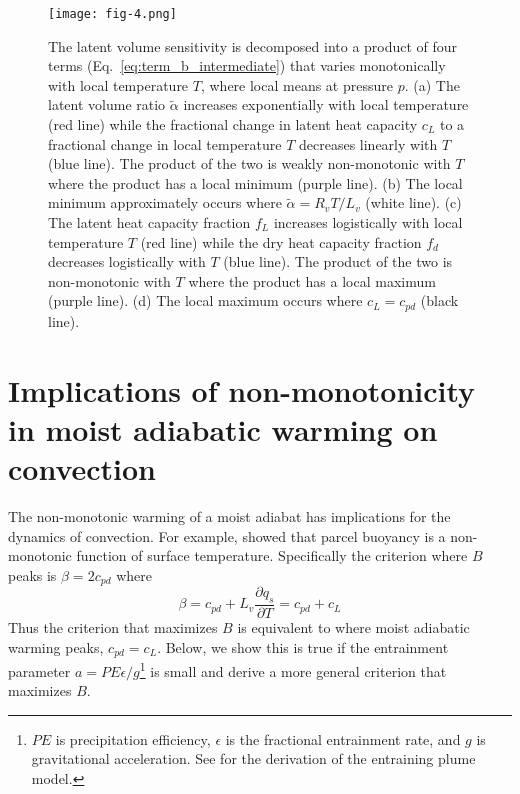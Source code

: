 \documentclass[draft]{ametsocV6.1}
\begin{document}
\begin{figure}[htbp]
 \centering
 \texttt{[image: fig-4.png]}\\
 \caption{The latent volume sensitivity is decomposed into a product of four terms (Eq.~\ref{eq:term_b_intermediate}) that varies monotonically with local temperature $T$, where local means at pressure $p$. (a) The latent volume ratio $\tilde{\alpha}$ increases exponentially with local temperature (red line) while the fractional change in latent heat capacity $c_L$ to a fractional change in local temperature $T$ decreases linearly with $T$ (blue line). The product of the two is weakly non-monotonic with $T$ where the product has a local minimum (purple line). (b) The local minimum approximately occurs where $\tilde{\alpha}= R_v T / L_v$ (white line). (c) The latent heat capacity fraction $f_L$ increases logistically with local temperature $T$ (red line) while the dry heat capacity fraction $f_d$ decreases logistically with $T$ (blue line). The product of the two is non-monotonic with $T$ where the product has a local maximum (purple line). (d) The local maximum occurs where $c_L=c_{pd}$ (black line).}\label{fig:fig-4}
\end{figure}


\section{Implications of non-monotonicity in moist adiabatic warming on convection}
The non-monotonic warming of a moist adiabat has implications for the dynamics of convection. For example, \cite{romps2016} showed that parcel buoyancy is a non-monotonic function of surface temperature. Specifically the criterion where $B$ peaks is $\beta = 2c_{pd}$ where
\begin{equation}
\beta = c_{pd} + L_v\frac{\partial q_s}{\partial T} = c_{pd} + c_L
\end{equation}
Thus the criterion that maximizes $B$ is equivalent to where moist adiabatic warming peaks, $c_{pd} = c_L$. Below, we show this is true if the entrainment parameter $a = PE \epsilon / g$\footnote{$PE$ is precipitation efficiency, $\epsilon$ is the fractional entrainment rate, and $g$ is gravitational acceleration. See \cite{romps2016} for the derivation of the entraining plume model.} is small and derive a more general criterion that maximizes $B$. 
\end{document}
